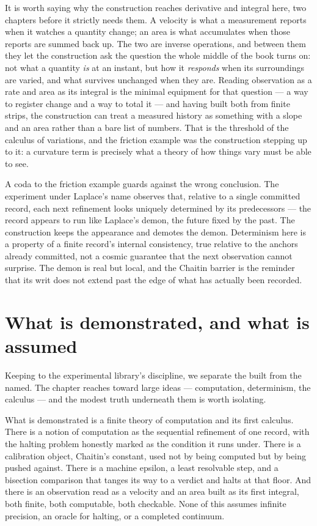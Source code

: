 It is worth saying why the construction reaches derivative and integral here, two chapters before it
strictly needs them. A velocity is what a measurement reports when it watches a quantity change; an
area is what accumulates when those reports are summed back up. The two are inverse operations, and
between them they let the construction ask the question the whole middle of the book turns on: not what
a quantity \emph{is} at an instant, but how it \emph{responds} when its surroundings are varied, and
what survives unchanged when they are. Reading observation as a rate and area as its integral is the
minimal equipment for that question --- a way to register change and a way to total it --- and having
built both from finite strips, the construction can treat a measured history as something with a slope
and an area rather than a bare list of numbers. That is the threshold of the calculus of variations,
and the friction example was the construction stepping up to it: a curvature term is precisely what a
theory of how things vary must be able to see.

A coda to the friction example guards against the wrong conclusion. The experiment under Laplace's
name observes that, relative to a single committed record, each next refinement looks uniquely
determined by its predecessors --- the record appears to run like Laplace's demon, the future fixed by
the past. The construction keeps the appearance and demotes the demon. Determinism here is a property
of a finite record's internal consistency, true relative to the anchors already committed, not a
cosmic guarantee that the next observation cannot surprise. The demon is real but local, and the
Chaitin barrier is the reminder that its writ does not extend past the edge of what has actually been
recorded.

\section{What is demonstrated, and what is assumed}
\label{se:demonstrated-assumed-ch4}

Keeping to the experimental library's discipline, we separate the built from the named. The chapter
reaches toward large ideas --- computation, determinism, the calculus --- and the modest truth
underneath them is worth isolating.

What is demonstrated is a finite theory of computation and its first calculus. There is a notion of
computation as the sequential refinement of one record, with the halting problem honestly marked as
the condition it runs under. There is a calibration object, Chaitin's constant, used not by being
computed but by being pushed against. There is a machine epsilon, a least resolvable step, and a
bisection comparison that tanges its way to a verdict and halts at that floor. And there is an
observation read as a velocity and an area built as its first integral, both finite, both computable,
both checkable. None of this assumes infinite precision, an oracle for halting, or a completed
continuum.


